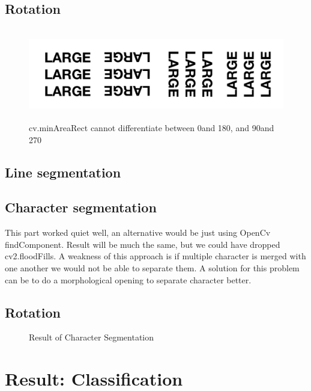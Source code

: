\documentclass[Report.tex]{subfiles}
\begin{document}
\subsection{Rotation}
\begin{figure}[H]
  \centering
  \includegraphics[height=4cm]{res/4angle_rot.png}
  \caption{cv.minAreaRect cannot differentiate between 0\textdegree and 180\textdegree, and 90\textdegree and 270\textdegree}
  \label{fig:4angle_rot}
\end{figure}


\subsection{Line segmentation}

\subsection{Character segmentation}
This part worked quiet well, an alternative would be just using OpenCv findComponent. Result will be much the same, but we could have dropped cv2.floodFills. A weakness of this approach is if multiple character is merged with one another we would not be able to separate them. A solution for this problem can be to do a morphological opening to separate character better.  
\subsection{Rotation}
\begin{figure}[H]
  \centering
  \caption{Result of Character Segmentation}
  \label{fig:Character_segmentation}
\end{figure}

\section{Result: Classification}
\end{document}

